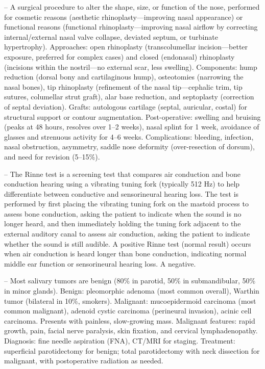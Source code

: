 -- A surgical procedure to alter the shape, size, or function of the nose, performed for cosmetic reasons (aesthetic rhinoplasty—improving nasal appearance) or functional reasons (functional rhinoplasty—improving nasal airflow by correcting internal/external nasal valve collapse, deviated septum, or turbinate hypertrophy). Approaches: open rhinoplasty (transcolumellar incision—better exposure, preferred for complex cases) and closed (endonasal) rhinoplasty (incisions within the nostril—no external scar, less swelling). Components: hump reduction (dorsal bony and cartilaginous hump), osteotomies (narrowing the nasal bones), tip rhinoplasty (refinement of the nasal tip—cephalic trim, tip sutures, columellar strut graft), alar base reduction, and septoplasty (correction of septal deviation). Grafts: autologous cartilage (septal, auricular, costal) for structural support or contour augmentation. Post-operative: swelling and bruising (peaks at 48 hours, resolves over 1--2 weeks), nasal splint for 1 week, avoidance of glasses and strenuous activity for 4--6 weeks. Complications: bleeding, infection, nasal obstruction, asymmetry, saddle nose deformity (over-resection of dorsum), and need for revision (5--15\%).

-- The Rinne test is a screening test that compares air conduction and bone conduction hearing using a vibrating tuning fork (typically 512 Hz) to help differentiate between conductive and sensorineural hearing loss. The test is performed by first placing the vibrating tuning fork on the mastoid process to assess bone conduction, asking the patient to indicate when the sound is no longer heard, and then immediately holding the tuning fork adjacent to the external auditory canal to assess air conduction, asking the patient to indicate whether the sound is still audible. A positive Rinne test (normal result) occurs when air conduction is heard longer than bone conduction, indicating normal middle ear function or sensorineural hearing loss. A negative.

-- Most salivary tumors are benign (80\% in parotid, 50\% in submandibular, 50\% in minor glands). Benign: pleomorphic adenoma (most common overall), Warthin tumor (bilateral in 10\%, smokers). Malignant: mucoepidermoid carcinoma (most common malignant), adenoid cystic carcinoma (perineural invasion), acinic cell carcinoma. Presents with painless, slow-growing mass. Malignant features: rapid growth, pain, facial nerve paralysis, skin fixation, and cervical lymphadenopathy. Diagnosis: fine needle aspiration (FNA), CT/MRI for staging. Treatment: superficial parotidectomy for benign; total parotidectomy with neck dissection for malignant, with postoperative radiation as needed.

